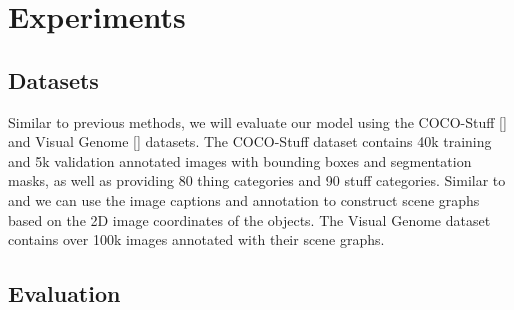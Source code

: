 \documentclass{article}
\begin{document}




\section{Experiments}

\subsection{Datasets}

Similar to previous methods, we will evaluate our model using the COCO-Stuff [\cite{cocostuff}] and Visual Genome [\cite{visualgen}] datasets. The COCO-Stuff dataset contains 40k training and 5k validation annotated images with bounding boxes and segmentation masks, as well as providing 80 thing categories and 90 stuff categories. Similar to \cite{sg2im} and \cite{sg2imgcontext} we can use the image captions and annotation to construct scene graphs based on the 2D image coordinates of the objects. The Visual Genome dataset contains over 100k images annotated with their scene graphs.

\subsection{Evaluation}
\end{document}
